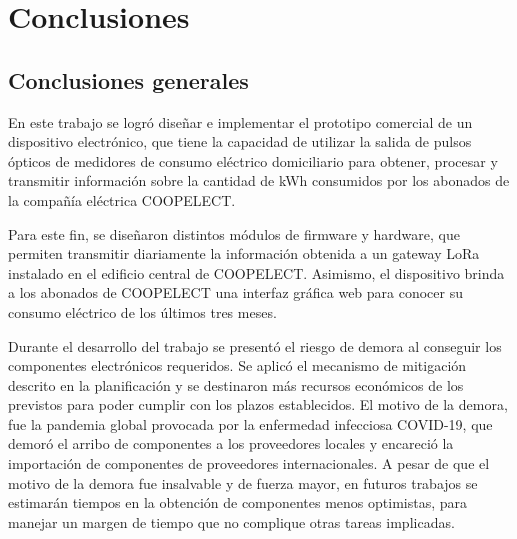 
\chapter{Conclusiones} %

\label{Chapter5} %




\section{Conclusiones generales }

En este trabajo se logró diseñar e implementar el prototipo comercial de un dispositivo electrónico, que tiene la capacidad de utilizar la salida de pulsos ópticos de medidores de consumo eléctrico domiciliario para obtener, procesar y transmitir información sobre la cantidad de kWh consumidos por los abonados de la compañía eléctrica COOPELECT.

Para este fin, se diseñaron distintos módulos de firmware y hardware, que permiten transmitir diariamente la información obtenida a un gateway LoRa instalado en el edificio central de COOPELECT. Asimismo, el dispositivo brinda a los abonados de COOPELECT una interfaz gráfica web para conocer su consumo eléctrico de los últimos tres meses.

Durante el desarrollo del trabajo se presentó el riesgo de demora al conseguir los componentes electrónicos requeridos. Se aplicó el mecanismo de mitigación descrito en la planificación y se destinaron más recursos económicos de los previstos para poder cumplir con los plazos establecidos. El motivo de la demora, fue la pandemia global provocada por la enfermedad infecciosa COVID-19, que demoró el arribo de componentes a los proveedores locales y encareció la importación de componentes de proveedores internacionales. A pesar de que el motivo de la demora fue insalvable y de fuerza mayor, en futuros trabajos se estimarán tiempos en la obtención de componentes menos optimistas, para manejar un margen de tiempo que no complique otras tareas implicadas.

